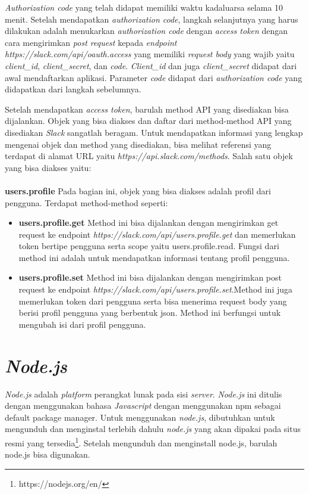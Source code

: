 \textit{Authorization code} yang telah didapat memiliki waktu kadaluarsa selama 10 menit. Setelah mendapatkan \textit{authorization code}, langkah selanjutnya yang harus dilakukan adalah menukarkan \textit{authorization code} dengan \textit{access token} dengan cara mengirimkan \textit{post request} kepada \textit{endpoint} \textit{https://slack.com/api/oauth.access} yang memiliki \textit{request body} yang wajib yaitu \textit{client\_id}, \textit{client\_secret}, dan \textit{code}. \textit{Client\_id} dan juga \textit{client\_secret} didapat dari awal mendaftarkan aplikasi. Parameter \textit{code} didapat dari \textit{authorization code} yang didapatkan dari langkah sebelumnya.

Setelah mendapatkan \textit{access token}, barulah method API yang disediakan bisa dijalankan.
Objek yang bisa diakses dan daftar dari method-method API yang disediakan \textit{Slack} sangatlah beragam. Untuk mendapatkan informasi yang lengkap mengenai objek dan method yang disediakan, bisa melihat referensi yang terdapat di alamat URL yaitu \textit{https://api.slack.com/methods}. Salah satu objek yang bisa diakses yaitu:\\
\\
\textbf{users.profile}
Pada bagian ini, objek yang bisa diakses adalah profil dari pengguna. Terdapat method-method seperti:
\begin{itemize}
	\item \textbf{users.profile.get}
	Method ini bisa dijalankan dengan mengirimkan get request ke endpoint \textit{https://slack.com/api/users.profile.get} dan memerlukan token bertipe pengguna serta scope yaitu users.profile.read. Fungsi dari method ini adalah untuk mendapatkan informasi tentang profil pengguna. 
	\item \textbf{users.profile.set}
	Method ini bisa dijalankan dengan mengirimkan post request ke endpoint \textit{	https://slack.com/api/users.profile.set}.Method ini juga memerlukan token dari pengguna serta bisa menerima request body yang berisi profil pengguna yang berbentuk json. Method ini berfungsi untuk mengubah isi dari profil pengguna. 
\end{itemize}

\section{\textit{Node.js}}
\label{sec:nodejs}
\textit{Node.js} adalah \textit{platform} perangkat lunak pada sisi \textit{server}.\cite{nodejs} \textit{Node.js} ini ditulis dengan menggunakan bahasa \textit{Javascript} dengan menggunakan npm sebagai default package manager. Untuk menggunakan \textit{node.js}, dibutuhkan untuk mengunduh dan menginstal terlebih dahulu \textit{node.js} yang akan dipakai pada situs resmi yang tersedia\footnote{https://nodejs.org/en/}. Setelah mengunduh dan menginstall node.js, barulah node.js bisa digunakan. 

